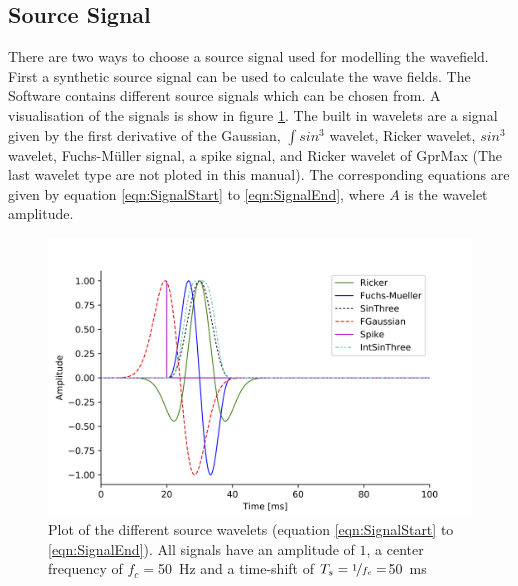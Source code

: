 \documentclass[pdftex,a4paper,parskip,listof=totoc,bibliography=totoc,onehalfspacing,12pt]{scrreprt}
\begin{document}
\subsection{Source Signal}\label{ch:sourcesignal}
There are two ways to choose a source signal used for modelling the wavefield. First a synthetic source signal can be used to calculate the wave fields. The Software contains different source signals which can be chosen from. A visualisation of the signals is show in figure \ref{fig:Signal}. The built in wavelets are a signal given by the first derivative of the Gaussian, $\int sin^3$ wavelet, Ricker wavelet, $sin^3$ wavelet, Fuchs-M\"uller signal, a spike signal, and Ricker wavelet of GprMax (The last wavelet type are not ploted in this manual). The corresponding equations are given by equation \ref{eqn:SignalStart} to \ref{eqn:SignalEnd}, where $A$ is the wavelet amplitude.
\begin{figure}[h!]
\centering
	\includegraphics[width=.7\textwidth]{images/Signal_Plot.png}
	\caption[Plot of the different source wavelets.]{Plot of the different source wavelets (equation \ref{eqn:SignalStart} to \ref{eqn:SignalEnd}). All signals have an amplitude of $1$, a center frequency of $f_c = $\SI{50}{Hz} and a time-shift of $T_s=\nicefrac{1}{f_c}=$\SI{50}{ms}}\label{fig:Signal}
\end{figure}
\end{document}

